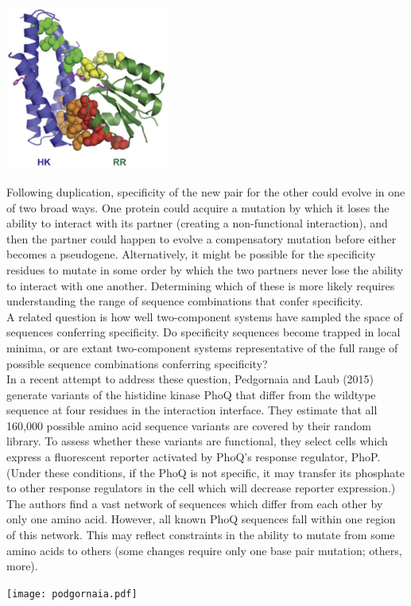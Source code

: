 \documentclass{article}
\begin{document}
\begin{center}
\includegraphics[width=0.4\textwidth]{spo0f.pdf}
\end{center}

Following duplication, specificity of the new pair for the other could evolve in one of two broad ways. One protein could acquire a mutation by which it loses the ability to interact with its partner (creating a non-functional interaction), and then the partner could happen to evolve a compensatory mutation before either becomes a pseudogene. Alternatively, it might be possible for the specificity residues to mutate in some order by which the two partners never lose the ability to interact with one another. Determining which of these is more likely requires understanding the range of sequence combinations that confer specificity.\\

A related question is how well two-component systems have sampled the space of sequences conferring specificity. Do specificity sequences become trapped in local minima, or are extant two-component systems representative of the full range of possible sequence combinations conferring specificity?\\

In a recent attempt to address these question, Pedgornaia and Laub (2015) generate variants of the histidine kinase PhoQ that differ from the wildtype sequence at four residues in the interaction interface. They estimate that all 160,000 possible amino acid sequence variants are covered by their random library. To assess whether these variants are functional, they select cells which express a fluorescent reporter activated by PhoQ's response regulator, PhoP. (Under these conditions, if the PhoQ is not specific, it may transfer its phosphate to other response regulators in the cell which will decrease reporter expression.) The authors find a vast network of sequences which differ from each other by only one amino acid. However, all known PhoQ sequences fall within one region of this network. This may reflect constraints in the ability to mutate from some amino acids to others (some changes require only one base pair mutation; others, more).

\begin{center}
\texttt{[image: podgornaia.pdf]}
\end{center}
\end{document}
